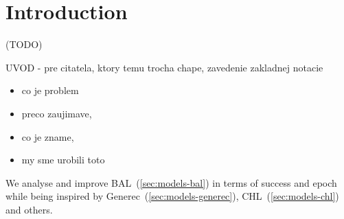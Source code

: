 







\section*{Introduction}
\label{sec:introduction} 


(TODO)

UVOD - pre citatela, ktory temu trocha chape, zavedenie zakladnej notacie 
\begin{itemize} 
\item   co je problem
\item   preco zaujimave,
\item   co je zname,
\item   my sme urobili toto
\end{itemize} 

We analyse and improve BAL~(\ref{sec:models-bal}) in terms of success and epoch while being inspired by Generec~(\ref{sec:models-generec}), CHL~(\ref{sec:models-chl}) and others. 

